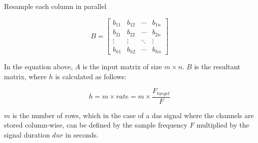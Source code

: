 
\begin{center}
Resample each column in parallel
\end{center}


\[
B = \begin{bmatrix}
b_{11} & b_{12} & \cdots & b_{1n} \\
b_{21} & b_{22} & \cdots & b_{2n} \\
\vdots & \vdots & \ddots & \vdots \\
b_{h1} & b_{h2} & \cdots & b_{hn}
\end{bmatrix}
\]

In the equation above, $A$ is the input matrix of size $m \times n$.  $B$ is the resultant matrix, where $h$ is calculated as follows: 

$$h = m \times rate = m \times \dfrac{F_{target}}{F}$$

$m$ is the number of rows, which in the case of a \acrshort{das} signal where the channels are stored column-wise, can be defined by the sample frequency $F$ multiplied by the signal duration $dur$ in seconds.